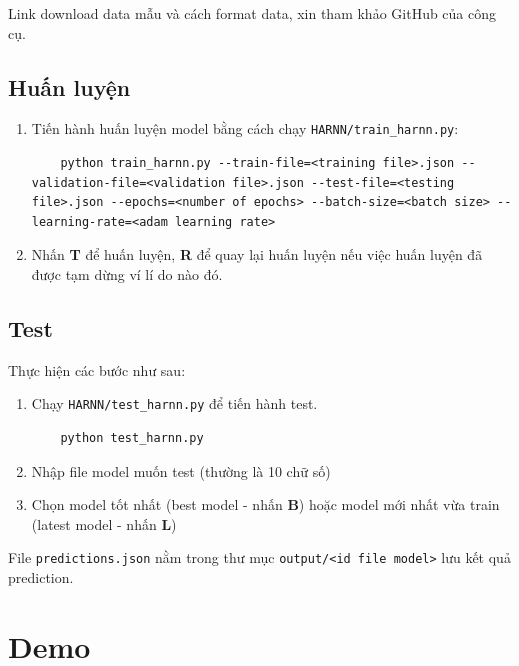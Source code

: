 \documentclass[12pt]{article}
\begin{document}
Link download data mẫu và cách format data, xin tham khảo GitHub của công cụ.

\subsection{Huấn luyện}
\begin{enumerate}
    \item Tiến hành huấn luyện model bằng cách chạy \texttt{HARNN/train\_harnn.py}:
    \begin{lstlisting}
    python train_harnn.py --train-file=<training file>.json --validation-file=<validation file>.json --test-file=<testing file>.json --epochs=<number of epochs> --batch-size=<batch size> --learning-rate=<adam learning rate>
    \end{lstlisting}
    \item Nhấn \textbf{T} để huấn luyện, \textbf{R} để quay lại huấn luyện nếu việc huấn luyện đã được tạm dừng ví lí do nào đó.
\end{enumerate}

\subsection{Test}
Thực hiện các bước như sau:
\begin{enumerate}
    \item Chạy \texttt{HARNN/test\_harnn.py} để tiến hành test.
    \begin{lstlisting}
    python test_harnn.py
    \end{lstlisting}
    \item Nhập file model muốn test (thường là 10 chữ số)
    \item Chọn model tốt nhất (best model - nhấn \textbf{B}) hoặc model mới nhất vừa train (latest model - nhấn \textbf{L})
\end{enumerate}
File \texttt{predictions.json} nằm trong thư mục \texttt{output/<id file model>} lưu kết quả prediction.

\section{Demo}
\end{document}
